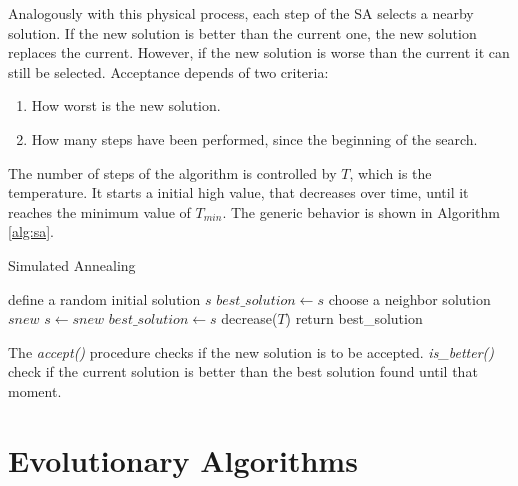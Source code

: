 			Analogously with this physical process, each step of the SA selects a nearby solution. If the new solution is better than the current one, the new solution replaces the current. However, if the new solution is worse than the current it can still be selected. Acceptance depends of two criteria:
			\begin{enumerate}
				\item How worst is the new solution.
				\item How many steps have been performed, since the beginning of the search.
			\end{enumerate}
			The number of steps of the algorithm is controlled by $T$, which is the temperature. It starts a initial high value, that decreases over time, until it reaches the minimum value of $T_{min}$. The generic behavior is shown in Algorithm \ref{alg:sa}.
			
			
			\begin{algorithm}
				\caption{Simulated Annealing}
				\label{alg:sa}
				\begin{algorithmic}
				\STATE define a random initial solution $s$
				\STATE $best\_solution \gets s$ 
					\STATE choose a neighbor solution $snew$
						\STATE  $s \gets snew$
					\ENDIF
						\STATE  $best\_solution \gets s$
					\ENDIF
					\STATE decrease($T$)
				\ENDWHILE
				\STATE return best\_solution
				\end{algorithmic}
			\end{algorithm}
		
		
		\noindent The \emph{accept()} procedure checks if the new solution is to be accepted. \emph{is\_better()} check if the current solution is better than the best solution found until that moment.

			
		\section{Evolutionary Algorithms}
			\label{subsec:evolutionary_algorithms}
			
